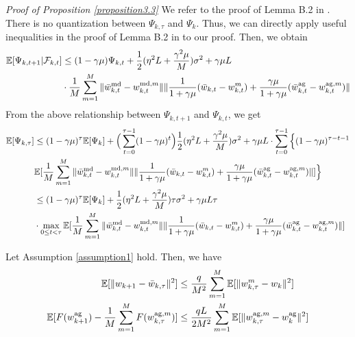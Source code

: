 \documentclass[11pt]{article}
\begin{document}
\emph{Proof of Proposition \ref{proposition3.3}} \textrm{ } We refer to the proof of Lemma B.2 in \cite{Yeojoon-yuan2020federated}. There is no quantization between $\Psi_{k, \tau}$ and $\Psi_k$. Thus, we can directly apply useful inequalities in the proof of Lemma B.2 in \cite{Yeojoon-yuan2020federated} to our proof. Then, we obtain
\begin{align*}
    \mathbb{E}[\Psi_{k, t+1}|\mathcal{F}_{k, t}] &\leq (1-\gamma\mu) \Psi_{k, t} + \frac{1}{2}(\eta^2 L + \frac{\gamma^2\mu}{M})\sigma^2 + \gamma\mu L \\
    &\cdot \frac{1}{M} \sum_{m=1}^M \|\Bar{w}_{k, t}^{\textrm{md}} - w_{k, t}^{\textrm{md}, m}\|\|\frac{1}{1+\gamma\mu}(\Bar{w}_{k, t} - w_{k, t}^m) + \frac{\gamma\mu}{1+\gamma\mu}(\Bar{w}_{k, t}^{\textrm{ag}} - w_{k, t}^{\textrm{ag}, m})\|
\end{align*}
From the above relationship between $\Psi_{k, t+1}$ and $\Psi_{k, t}$, we get
\begin{align*}
    \mathbb{E}[\Psi_{k, \tau}] &\leq (1-\gamma\mu)^\tau \mathbb{E}[\Psi_k] + \Big(\sum_{t=0}^{\tau-1} (1-\gamma\mu)^t \Big)\frac{1}{2}(\eta^2 L + \frac{\gamma^2\mu}{M})\sigma^2 + \gamma\mu L \cdot \sum_{t=0}^{\tau-1} \Big\{ (1-\gamma\mu)^{\tau-t-1} \\
    &\mathbb{E}[\frac{1}{M} \sum_{m=1}^M \|\Bar{w}_{k, t}^{\textrm{md}} - w_{k, t}^{\textrm{md}, m}\|\|\frac{1}{1+\gamma\mu}(\Bar{w}_{k, t} - w_{k, t}^m) + \frac{\gamma\mu}{1+\gamma\mu}(\Bar{w}_{k, t}^{\textrm{ag}} - w_{k, t}^{\textrm{ag}, m})\|]\Big\} \\
    &\leq (1-\gamma\mu)^\tau \mathbb{E}[\Psi_k] + \frac{1}{2}(\eta^2 L + \frac{\gamma^2\mu}{M})\tau\sigma^2 + \gamma\mu L \tau \\
    &\cdot \max_{0\leq t <\tau} \mathbb{E}[\frac{1}{M} \sum_{m=1}^M \|\Bar{w}_{k, t}^{\textrm{md}} - w_{k, t}^{\textrm{md}, m}\|\|\frac{1}{1+\gamma\mu}(\Bar{w}_{k, t} - w_{k, t}^m) + \frac{\gamma\mu}{1+\gamma\mu}(\Bar{w}_{k, t}^{\textrm{ag}} - w_{k, t}^{\textrm{ag}, m})\|]
\end{align*}

\begin{proposition} \label{proposition3.4}
Let Assumption \ref{assumption1} hold. Then, we have
\begin{align*}
    \mathbb{E}[\|w_{k+1} - \Bar{w}_{k, \tau}\|^2] &\leq \frac{q}{M^2}\sum_{m=1}^M \mathbb{E}[\|w_{k, \tau}^m - w_k\|^2] \\
    \mathbb{E}[F(w_{k+1}^{\textrm{ag}}) - \frac{1}{M} \sum_{m=1}^M F(w_{k, \tau}^{\textrm{ag}, m})] &\leq \frac{qL}{2M^2} \sum_{m=1}^M \mathbb{E}[\|w_{k, \tau}^{\textrm{ag}, m} - w_k^{\textrm{ag}}\|^2]
\end{align*}
\end{proposition}
\end{document}
